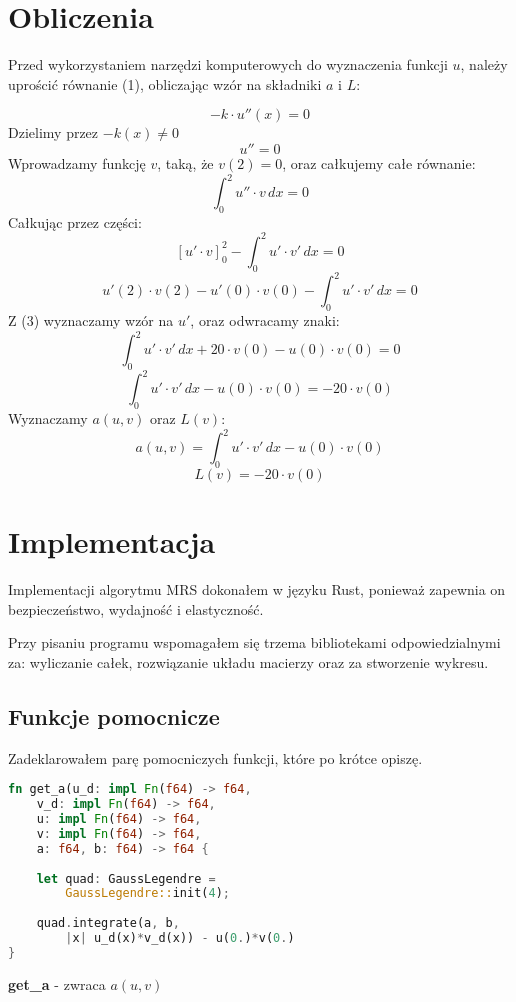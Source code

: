 \documentclass[12pt]{article}
\begin{document}
\newpage
\section{Obliczenia}
Przed wykorzystaniem narzędzi komputerowych do wyznaczenia funkcji $u$, 
 należy uprościć równanie (1), obliczając wzór na składniki $a$ i $L$:

\[
	-k \cdot u''(x) = 0	
\]
Dzielimy przez $-k(x) \ne 0$
\[
	u'' = 0	
\]
Wprowadzamy funkcję $v$, taką, że $v(2) = 0$, oraz całkujemy całe równanie:
\[
	\int_{0}^{2}u''\cdot v \,dx = 0
\]
Całkując przez części:
\[
	\left[ u' \cdot v  \right]_0^2 - \int_{0}^{2}u'\cdot v' \,dx = 0
\]
\[
	u'(2) \cdot v(2) - u'(0) \cdot v(0) - \int_{0}^{2}u'\cdot v' \,dx = 0
\]
Z (3) wyznaczamy wzór na $u'$, oraz odwracamy znaki:
\[
	\int_{0}^{2}u'\cdot v' \,dx + 20 \cdot v(0) - u(0) \cdot v(0) = 0
\]
\[
	\int_{0}^{2}u'\cdot v' \,dx - u(0) \cdot v(0) = -20 \cdot v(0)
\]
Wyznaczamy $a(u, v)$ oraz $L(v)$:
\begin{equation}
	a(u, v) = \int_{0}^{2}u'\cdot v' \,dx - u(0) \cdot v(0)
\end{equation}
\begin{equation}
	L(v) = -20 \cdot v(0)
\end{equation}

\newpage
\section{Implementacja}
Implementacji algorytmu MRS dokonałem w języku Rust, ponieważ zapewnia
on bezpieczeństwo, wydajność i elastyczność. 

\noindent Przy pisaniu programu wspomagałem się trzema bibliotekami
 odpowiedzialnymi za: wyliczanie całek, rozwiązanie układu macierzy oraz za
 stworzenie wykresu.


\subsection[short]{Funkcje pomocnicze}
Zadeklarowałem parę pomocniczych funkcji, które po krótce opiszę.


\begin{lstlisting}[language=Rust, style=boxed]
fn get_a(u_d: impl Fn(f64) -> f64, 
	v_d: impl Fn(f64) -> f64,
	u: impl Fn(f64) -> f64, 
	v: impl Fn(f64) -> f64,
	a: f64, b: f64) -> f64 {
		
    let quad: GaussLegendre = 
		GaussLegendre::init(4);
		
    quad.integrate(a, b,
		|x| u_d(x)*v_d(x)) - u(0.)*v(0.)
}
\end{lstlisting}
\centerline{\textbf{get\_a} - zwraca $a(u,v)$}
\vskip 1cm
\end{document}
